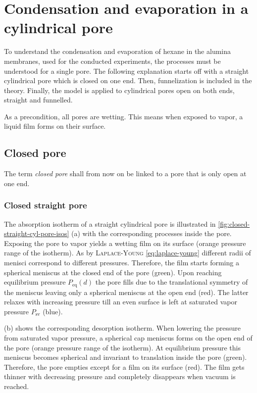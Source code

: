 \documentclass[../thesis.tex]{subfiles}
\begin{document}
    \section{Condensation and evaporation in a cylindrical pore}
    \label{sec:cond_evap_theory}

        To understand the condensation and evaporation of hexane in the alumina membranes, used for the conducted experiments, the processes must be understood for a single pore. The following explanation starts off with a straight cylindrical pore which is closed on one end. Then, funnelization is included in the theory. Finally, the model is applied to cylindrical pores open on both ends, straight and funnelled.
        \medskip

        As a precondition, all pores are wetting. This means when exposed to vapor, a liquid film forms on their surface.


        \subsection{Closed pore}

            The term \textit{closed pore} shall from now on be linked to a pore that is only open at one end.

            \subsubsection{Closed straight pore}

                The absorption isotherm of a straight cylindrical pore is illustrated in \cref{fig:closed-straight-cyl-pore-isos} (a) with the corresponding processes inside the pore. Exposing the pore to vapor yields a wetting film on its surface (orange pressure range of the isotherm). As by \textsc{Laplace-Young} \cref{eq:laplace-young} different radii of menisci correspond to different pressures. Therefore, the film starts forming a spherical meniscus at the closed end of the pore (green). Upon reaching equilibrium pressure $P_\mathrm{eq}(d)$ the pore fills due to the translational symmetry of the meniscus leaving only a spherical meniscus at the open end (red). The latter relaxes with increasing pressure till an even surface is left at saturated vapor pressure $P_\mathrm{sv}$ (blue).
                \medskip

                 (b) shows the corresponding desorption isotherm. When lowering the pressure from saturated vapor pressure, a spherical cap meniscus forms on the open end of the pore (orange pressure range of the isotherm). At equilibrium pressure this meniscus becomes spherical and invariant to translation inside the pore (green). Therefore, the pore empties except for a film on its surface (red). The film gets thinner with decreasing pressure and completely disappears when vacuum is reached.
\end{document}
